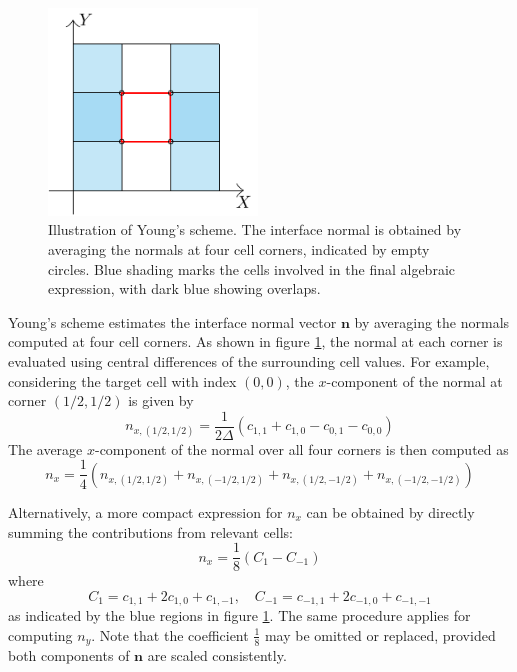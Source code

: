 \begin{figure}[H]
  \centering
  \includegraphics[height=5.5cm]{./image/myc-h-and-myc2d-h/Youngs.pdf}
  \caption{Illustration of Young's scheme. The interface normal is obtained by averaging the normals at four cell corners, indicated by empty circles. Blue shading marks the cells involved in the final algebraic expression, with dark blue showing overlaps.}
  \label{fig:myc-young}
\end{figure}

Young's scheme estimates the interface normal vector $\mathbf{n}$ by averaging the normals computed at four cell corners. As shown in figure \ref{fig:myc-young}, the normal at each corner is evaluated using central differences of the surrounding cell values. For example, considering the target cell with index $(0,0)$, the $x$-component of the normal at corner $(1/2, 1/2)$ is given by
\begin{equation}
  n_{x,(1/2,1/2)} = \frac{1}{2\Delta}\left(c_{1,1} + c_{1,0} - c_{0,1} - c_{0,0}\right)
\end{equation}
The average $x$-component of the normal over all four corners is then computed as
\begin{equation}
  n_x = \frac{1}{4} \left(n_{x,(1/2,1/2)} + n_{x,(-1/2,1/2)} + n_{x,(1/2,-1/2)} + n_{x,(-1/2,-1/2)} \right)
\end{equation}

Alternatively, a more compact expression for $n_x$ can be obtained by directly summing the contributions from relevant cells:
\begin{equation}
  n_x = \frac{1}{8} \left(C_1 - C_{-1}\right)
\end{equation}
where
\begin{equation*}
  C_1 = c_{1,1} + 2c_{1,0} + c_{1,-1}, \quad C_{-1} = c_{-1,1} + 2c_{-1,0} + c_{-1,-1}
\end{equation*}
as indicated by the blue regions in figure \ref{fig:myc-young}. The same procedure applies for computing $n_y$. Note that the coefficient $\frac{1}{8}$ may be omitted or replaced, provided both components of $\mathbf{n}$ are scaled consistently.

\printbibliography
